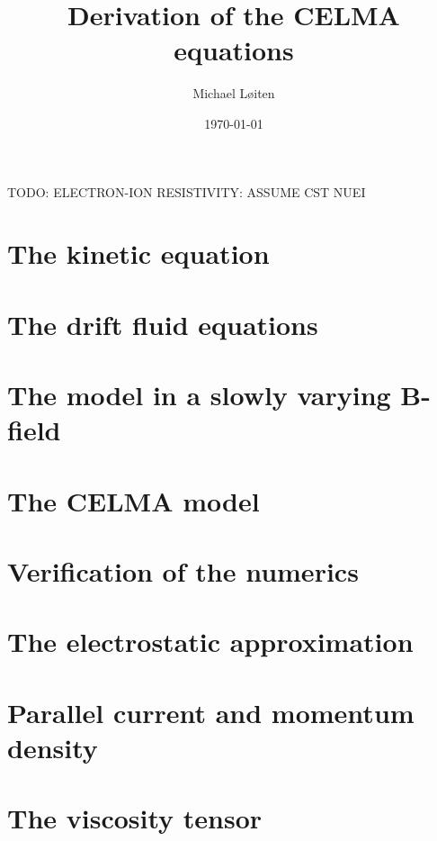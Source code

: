 \documentclass[12pt,a4paper,oneside,openright]{report} %
\title{\vspace{-8ex}Derivation of the CELMA equations\vspace{-1ex}}
\author{Michael L{\o}iten}
\date{\vspace{-2ex}\today}
\begin{document}
\maketitle

TODO: ELECTRON-ION RESISTIVITY: ASSUME CST NUEI
\chapter{The kinetic equation}

%
\chapter{The drift fluid equations}
\label{chap:drift-order}


\chapter{The model in a slowly varying B-field}


\chapter{The CELMA model}






%
%
\chapter{Verification of the numerics}
\label{app:verification}


\appendix

\chapter{The electrostatic approximation}
\label{app:elstat}


\chapter{Parallel current and momentum density}
\label{app:currentMomentum}


\chapter{The viscosity tensor}
\label{app:piTensor}

\end{document}
